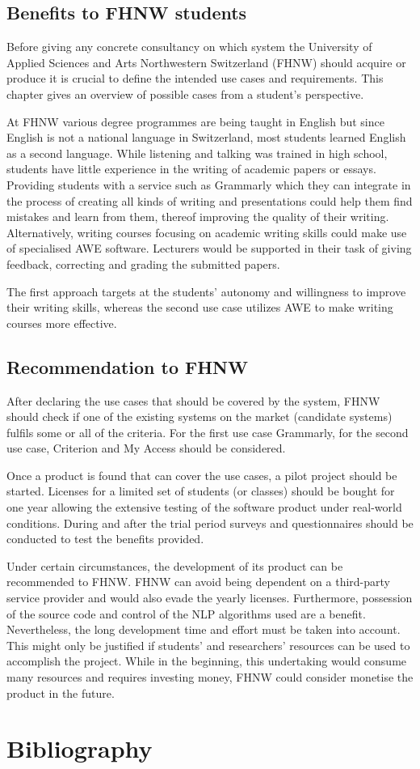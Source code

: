 \documentclass[runningheads]{llncs}
\let\OldTextregistered\textregistered
\renewcommand{\textregistered}{\OldTextregistered\xspace}
\begin{document}
\subsection{Benefits to FHNW students}
Before giving any concrete consultancy on which system the University of Applied Sciences and Arts Northwestern Switzerland (FHNW) should acquire or produce it is crucial to define the intended use cases and requirements. This chapter gives an overview of possible cases from a student's perspective.

At FHNW various degree programmes are being taught in English \citep{noauthor_fhnw_nodate} but since English is not a national language in Switzerland, most students learned English as a second language. While listening and talking was trained in high school, students have little experience in the writing of academic papers or essays. Providing students with a service such as Grammarly\textregistered which they can integrate in the process of creating all kinds of writing and presentations could help them find mistakes and learn from them, thereof improving the quality of their writing. Alternatively, writing courses focusing on academic writing skills could make use of specialised AWE software. Lecturers would be supported in their task of giving feedback, correcting and grading the submitted papers.

The first approach targets at the students' autonomy and willingness to improve their writing skills, whereas the second use case utilizes AWE to make writing courses more effective. 

\subsection{Recommendation to FHNW}
After declaring the use cases that should be covered by the system, FHNW should check if one of the existing systems on the market (candidate systems) fulfils some or all of the criteria. For the first use case Grammarly\textregistered, for the second use case, Criterion\textregistered and My Access should be considered. 

Once a product is found that can cover the use cases, a pilot project should be started. Licenses for a limited set of students (or classes) should be bought for one year allowing the extensive testing of the software product under real-world conditions. During and after the trial period surveys and questionnaires should be conducted to test the benefits provided. 

Under certain circumstances, the development of its product can be recommended to FHNW. FHNW can avoid being dependent on a third-party service provider and would also evade the yearly licenses. Furthermore, possession of the source code and control of the NLP algorithms used are a benefit. Nevertheless, the long development time and effort must be taken into account. This might only be justified if students' and researchers' resources can be used to accomplish the project. While in the beginning, this undertaking would consume many resources and requires investing money, FHNW could consider monetise the product in the future.

\section{Bibliography}


\printbibliography
\end{document}

